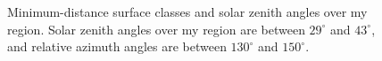 \documentclass[12pt]{article}
\begin{document}
\begin{figure}[h!]
    \centering
    \begin{center}
    \end{center}
    \caption{Minimum-distance surface classes and solar zenith angles over my region. Solar zenith angles over my region are between $29^\circ$ and $43^\circ$, and relative azimuth angles are between $130^\circ$ and $150^\circ$.}
    \label{region_classes}
\end{figure}
\end{document}
